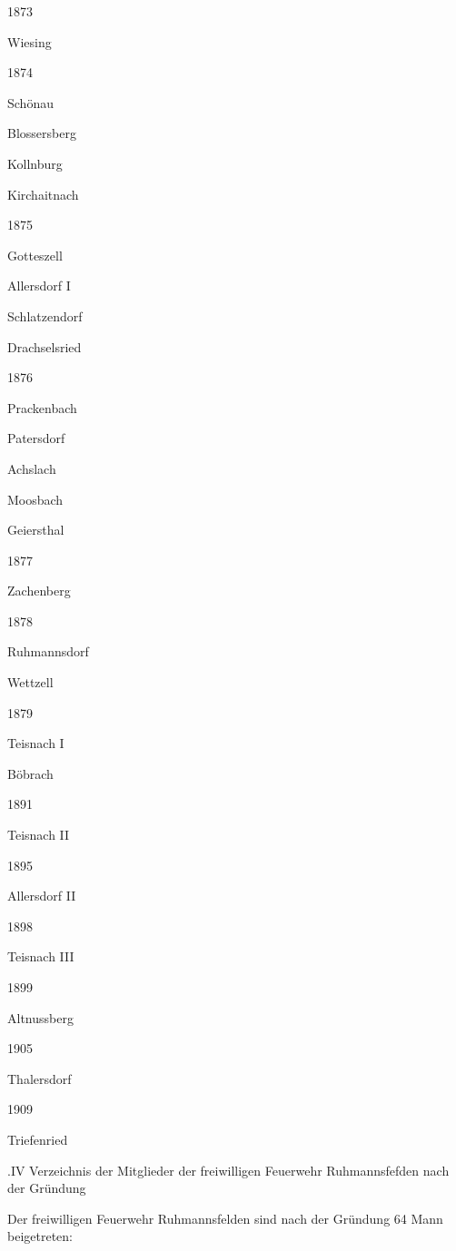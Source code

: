 \documentclass[12pt,a4paper]{book}
\begin{document}
1873

Wiesing

1874

Schönau



Blossersberg



Kollnburg



Kirchaitnach

1875

Gotteszell



Allersdorf I



Schlatzendorf



Drachselsried

1876

Prackenbach



Patersdorf



Achslach



Moosbach



Geiersthal

1877

Zachenberg

1878

Ruhmannsdorf



Wettzell

1879

Teisnach I



Böbrach

1891

Teisnach II

1895

Allersdorf II

1898

Teisnach III

1899

Altnussberg

1905

Thalersdorf

1909

Triefenried

.IV Verzeichnis der Mitglieder der freiwilligen Feuerwehr Ruhmannsfefden nach
der Gründung

Der freiwilligen Feuerwehr Ruhmannsfelden sind nach der Gründung 64 Mann
beigetreten:
\end{document}
